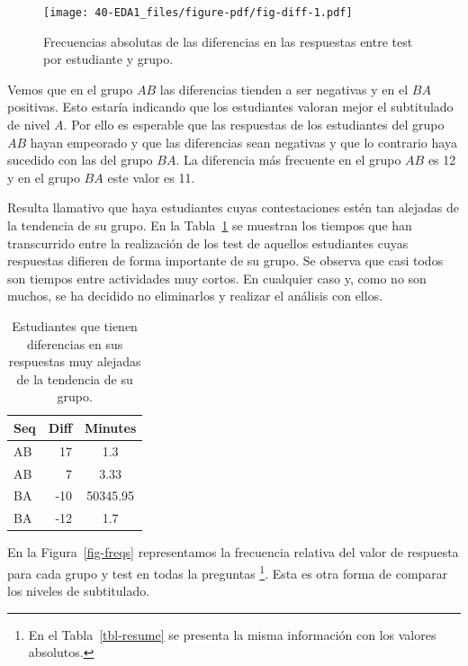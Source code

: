 \documentclass[
  12pt,
  a4paper,
  extrafontsizes,
  onecolumn,
  openright]{memoir}
\begin{document}
\begin{figure}[h]

{\centering \texttt{[image: 40-EDA1\_files/figure-pdf/fig-diff-1.pdf]}

}

\caption{\label{fig-diff}Frecuencias absolutas de las diferencias en las
respuestas entre test por estudiante y grupo.}

\end{figure}

Vemos que en el grupo \(AB\) las diferencias tienden a ser negativas y
en el \(BA\) positivas. Esto estaría indicando que los estudiantes
valoran mejor el subtitulado de nivel \(A\). Por ello es esperable que
las respuestas de los estudiantes del grupo \(AB\) hayan empeorado y que
las diferencias sean negativas y que lo contrario haya sucedido con las
del grupo \(BA\). La diferencia más frecuente en el grupo \(AB\) es 12 y
en el grupo \(BA\) este valor es 11.

Resulta llamativo que haya estudiantes cuyas contestaciones estén tan
alejadas de la tendencia de su grupo. En la Tabla~\ref{tbl-diff} se
muestran los tiempos que han transcurrido entre la realización de los
test de aquellos estudiantes cuyas respuestas difieren de forma
importante de su grupo. Se observa que casi todos son tiempos entre
actividades muy cortos. En cualquier caso y, como no son muchos, se ha
decidido no eliminarlos y realizar el análisis con ellos.

\hypertarget{tbl-diff}{}
\begin{longtable}{lrc}
\caption{\label{tbl-diff}Estudiantes que tienen diferencias en sus respuestas muy alejadas de la
tendencia de su grupo. }\tabularnewline

\toprule
Seq & Diff & Minutes \\ 
\midrule
AB & 17 & 1.3 \\ 
AB & 7 & 3.33 \\ 
BA & -10 & 50345.95 \\ 
BA & -12 & 1.7 \\ 
\bottomrule
\end{longtable}

En la Figura~\ref{fig-freqs} representamos la frecuencia relativa del
valor de respuesta para cada grupo y test en todas la preguntas
\footnote{En el Tabla~\ref{tbl-resume} se presenta la misma información
  con los valores absolutos.}. Esta es otra forma de comparar los
niveles de subtitulado.
\end{document}
